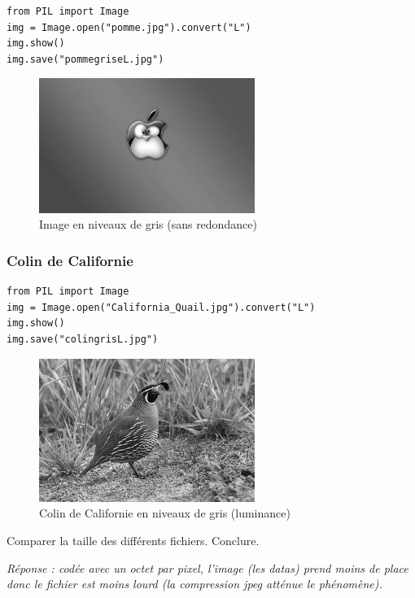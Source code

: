 \documentclass[11pt]{article}
\begin{document}
\begin{verbatim}
from PIL import Image
img = Image.open("pomme.jpg").convert("L")
img.show()
img.save("pommegriseL.jpg")
\end{verbatim}


\begin{figure}[htbp]
\centering
\includegraphics[width=7cm]{pommegriseL.jpg}
\caption{Image en niveaux de gris (sans redondance)}
\end{figure}


\subsubsection{Colin de Californie}
\label{sec:org2ed6ac1}

\begin{verbatim}
from PIL import Image
img = Image.open("California_Quail.jpg").convert("L")
img.show()
img.save("colingrisL.jpg")
\end{verbatim}


\begin{figure}[htbp]
\centering
\includegraphics[width=7cm]{colingrisL.jpg}
\caption{Colin de Californie en niveaux de gris (luminance)}
\end{figure}

Comparer la taille des différents fichiers. Conclure.



\emph{Réponse : codée avec un octet par pixel, l'image (les datas) prend moins de place donc le fichier est moins lourd (la compression jpeg atténue le phénomène).}
\end{document}

